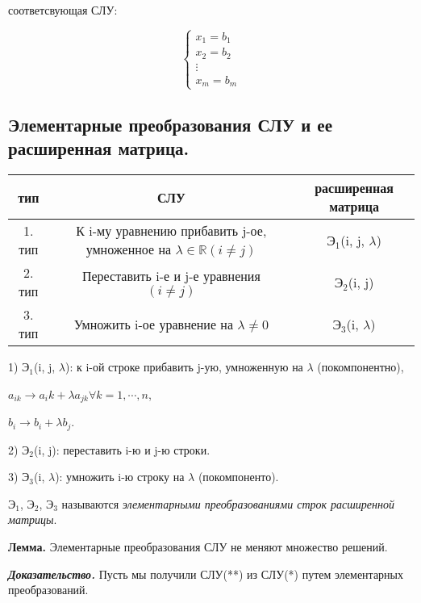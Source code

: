 соответсвующая СЛУ:

\begin{equation*}
    \left\{
		\begin{aligned}
        x_1 = b_1 \\
        x_2 = b_2 \\
        \vdots \\
        x_m = b_m
		\end{aligned}
	\right.
\end{equation*}

\subsection{Элементарные преобразования СЛУ и ее расширенная матрица.}

\vspace{\baselineskip}
\begin{table}[!ht]
		\begin{tabular}{c|c|c}
    	тип & СЛУ & расширенная матрица \\
        \hline
        1. тип & К i-му уравнению прибавить j-ое, умноженное на $\lambda \in \mathbb{R} (i \neq j)$ & $Э_1$(i, j, $\lambda$) \\
        2. тип & Переставить i-е и j-е уравнения $(i \neq j)$  & $Э_2$(i, j) \\
        3. тип & Умножить i-ое уравнение на $\lambda \neq 0$ & $Э_3$(i, $\lambda$) 
		\end{tabular}
\end{table}

\vspace{\baselineskip}
1) $Э_1$(i, j, $\lambda$): к i-ой строке прибавить j-ую, умноженную на $\lambda$ (покомпонентно),

$a_{ik} \rightarrow a_ik + \lambda a_{jk} \forall k = 1, \cdots, n$,

$b_i \rightarrow b_i + \lambda b_j$.

2) $Э_2$(i, j): переставить i-ю и j-ю строки.

3) $Э_3$(i, $\lambda$): умножить i-ю строку на $\lambda$ (покомпоненто).

\vspace{\baselineskip}
$Э_1$, $Э_2$, $Э_3$ называются \textit{элементарными преобразованиями строк расширенной матрицы}.

\vspace{\baselineskip}
\textbf{Лемма.} Элементарные преобразования СЛУ не меняют множество решений.

\vspace{\baselineskip}
\textbf{\textit{Доказательство.}} Пусть мы получили СЛУ(**) из СЛУ(*) путем элементарных преобразований.

